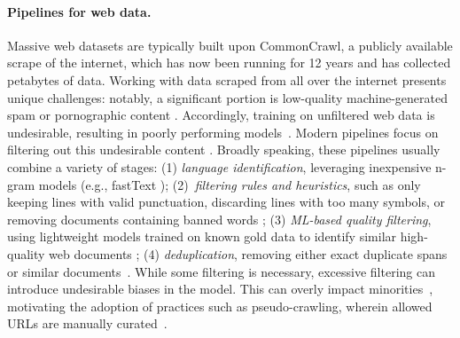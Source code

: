 \paragraph{Pipelines for web data.} Massive web datasets are typically built upon CommonCrawl, a publicly available scrape of the internet, which has now been running for 12 years and has collected petabytes of data. Working with data scraped from all over the internet presents unique challenges: notably, a significant portion is low-quality machine-generated spam or pornographic content \cite{trinh2018simple, kreutzer2022quality}. Accordingly, training on unfiltered web data is undesirable, resulting in poorly performing models~\cite{2020t5}. Modern pipelines focus on filtering out this undesirable content \cite{wenzek2020ccnet}. Broadly speaking, these pipelines usually combine a variety of stages: (1) \emph{language identification}, leveraging inexpensive n-gram models (e.g., fastText \citet{joulin2016fasttext}); (2)~\emph{filtering rules and heuristics}, such as only keeping lines with valid punctuation, discarding lines with too many symbols, or removing documents containing banned words \cite{grave2018learning, 2020t5}; (3) \emph{ML-based quality filtering}, using lightweight models trained on known gold data to identify similar high-quality web documents \cite{wenzek2020ccnet, brown2020language}; (4) \emph{deduplication}, removing either exact duplicate spans or similar documents~\cite{lee2022deduplicating}. While some filtering is necessary, excessive filtering can introduce undesirable biases in the model. This can overly impact minorities~\cite{dodge2021documenting}, motivating the adoption of practices such as pseudo-crawling, wherein allowed URLs are manually curated~\cite{laurencconbigscience}.


